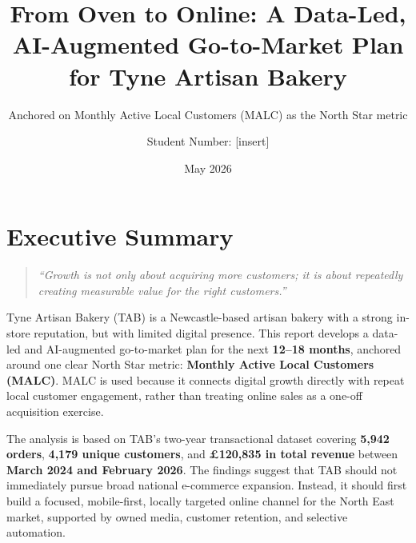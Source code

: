 \documentclass[
  11pt,
]{article}
\title{From Oven to Online: A Data-Led, AI-Augmented Go-to-Market Plan
for Tyne Artisan Bakery}
\subtitle{Anchored on Monthly Active Local Customers (MALC) as the North
Star metric}
\author{Student Number: {[}insert{]}}
\date{May 2026}
\begin{document}
\maketitle

{
\setcounter{tocdepth}{3}
\tableofcontents
}
\newpage

\section{Executive Summary}\label{executive-summary}

\begin{quote}
\emph{``Growth is not only about acquiring more customers; it is about
repeatedly creating measurable value for the right customers.''}
\end{quote}

Tyne Artisan Bakery (TAB) is a Newcastle-based artisan bakery with a
strong in-store reputation, but with limited digital presence. This
report develops a data-led and AI-augmented go-to-market plan for the
next \textbf{12--18 months}, anchored around one clear North Star
metric: \textbf{Monthly Active Local Customers (MALC)}. MALC is used
because it connects digital growth directly with repeat local customer
engagement, rather than treating online sales as a one-off acquisition
exercise.

The analysis is based on TAB's two-year transactional dataset covering
\textbf{5,942 orders}, \textbf{4,179 unique customers}, and
\textbf{£120,835 in total revenue} between \textbf{March 2024 and
February 2026}. The findings suggest that TAB should not immediately
pursue broad national e-commerce expansion. Instead, it should first
build a focused, mobile-first, locally targeted online channel for the
North East market, supported by owned media, customer retention, and
selective automation.
\end{document}
